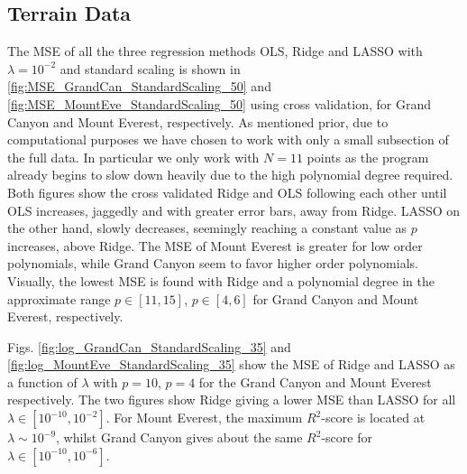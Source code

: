 \documentclass[%
reprint,
amsmath,amssymb,
aps,
pra,
]{revtex4-2}
\begin{document}
\subsection{Terrain Data}
The MSE of all the three regression methods OLS, Ridge and LASSO with \(\lambda=10^{-2}\) and standard scaling is shown in \ref{fig:MSE_GrandCan_StandardScaling_50} and \ref{fig:MSE_MountEve_StandardScaling_50} using cross validation, for Grand Canyon and Mount Everest, respectively. As mentioned prior, due to computational purposes we have chosen to work with only a small subsection of the full data. In particular we only work with $N=11$ points as the program already begins to slow down heavily due to the high polynomial degree required. 
Both figures show the cross validated Ridge and OLS following each other until OLS increases, jaggedly and with greater error bars, away from Ridge. LASSO on the other hand, slowly decreases, seemingly reaching a constant value as \(p\) increases, above Ridge. The MSE of Mount Everest is greater for low order polynomials, while Grand Canyon seem to favor higher order polynomials. Visually, the lowest MSE is found with Ridge and a polynomial degree in the approximate range \(p\in[11, 15]\), \(p\in[4,6]\) for Grand Canyon and Mount Everest, respectively. 

Figs. \ref{fig:log_GrandCan_StandardScaling_35} and \ref{fig:log_MountEve_StandardScaling_35} show the MSE of Ridge and LASSO as a function of \(\lambda\) with \(p=10\), \(p=4\) for the Grand Canyon and Mount Everest respectively. The two figures show Ridge giving a lower MSE than LASSO for all \(\lambda\in[10^{-10}, 10^{-2}]\). For Mount Everest, the maximum \(R^2\)-score is located at \(\lambda\sim 10^{-9}\), whilst Grand Canyon gives about the same \(R^2\)-score for \(\lambda\in[10^{-10}, 10^{-6}]\).
\end{document}
